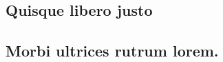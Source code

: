 \documentclass[
	12pt,				%
	openright,			%
	oneside,
	a4paper,			%
	chapter=TITLE,		%
	english,			%
	french,				%
	spanish,			%
	brazil				%
	]{abntex2}
\begin{document}





%
%


\begin{apendicesenv}


\chapter{Quisque libero justo}



\end{apendicesenv}



\begin{anexosenv}


\chapter{Morbi ultrices rutrum lorem.}


\end{anexosenv}

\printindex
\end{document}
